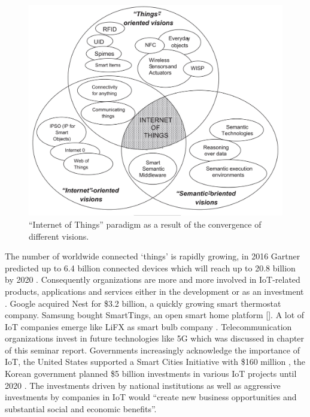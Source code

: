 	\begin{figure}[ht]
	    \begin{center}
	    \includegraphics[scale=0.35]{Talk11/iot_visions.jpg}
	    \end{center}
	    \caption{``Internet of Things'' paradigm as a result of the convergence of different visions.}
	    \label{fig:iot_visions}
    \end{figure}

	The number of worldwide connected `things' is rapidly growing, in 2016 Gartner predicted up to 6.4 billion connected devices which will reach up to 20.8 billion by 2020 \cite{gartner}. Consequently organizations are more and more involved in IoT-related products, applications and services either in the development or as an investment \cite{ju}. Google acquired Nest for \$3.2 billion, a quickly growing smart thermostat company. Samsung bought SmartTings, an open smart home platform []. A lot of IoT companies emerge like LiFX as smart bulb company . Telecommunication organizations invest in future technologies like 5G which was discussed in chapter  of this seminar report. Governments increasingly acknowledge the importance of IoT, the United States supported a Smart Cities Initiative with \$160 million \todo{[]}, the Korean government planned \$5 billion investments in various IoT projects until 2020 \todo{[]}. The investments driven by national institutions as well as aggressive investments by companies in IoT would ``create new business opportunities and substantial social and economic benefits''\todo{[]}. 

